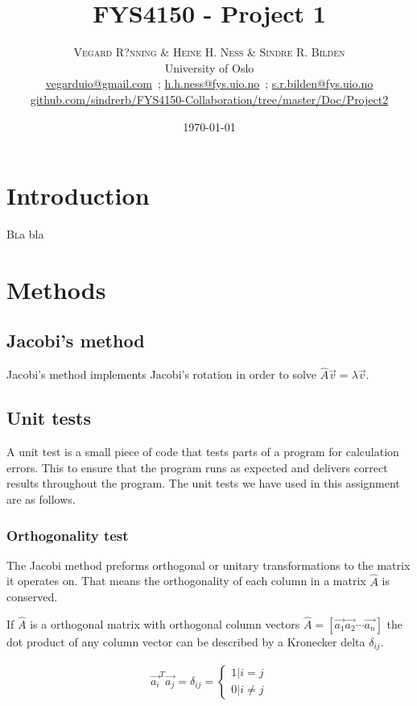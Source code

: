 \documentclass[twoside,twocolumn]{article}
\title{FYS4150 - Project 1} %
\author{%
	\textsc{Vegard R?nning \& Heine H. Ness \& Sindre R. Bilden} \\[1ex] %
	\normalsize University of Oslo \\ %
	\normalsize \href{mailto:vegarduio@gmail.com}{vegarduio@gmail.com}\ ; \href{mailto:h.h.ness@fys.uio.no}{h.h.ness@fys.uio.no}\ ; \href{mailto:s.r.bilden@fys.uio.no}{s.r.bilden@fys.uio.no}\\%
	\footnotesize \href{https://github.com/sindrerb/FYS4150-Collaboration/tree/master/Doc/Project2}{github.com/sindrerb/FYS4150-Collaboration/tree/master/Doc/Project2}
}
\date{\today} %
\newcommand{\nl}{
	
	\medskip
	\noindent
}
\begin{document}
	
	\maketitle
	
	
	\section{Introduction}
	\lettrine[nindent=0em,lines=3]{B}la bla
	
	\section{Methods}
	\subsection{Jacobi's method}
	Jacobi's method implements Jacobi's rotation in order to solve $\hat{A}\vec v=\lambda \vec v$. 
	
	
	\subsection{Unit tests}
	
	A unit test is a small piece of code that tests parts of a program for calculation errors. This to ensure that the program runs as expected and delivers correct results throughout the program. The unit tests we have used in this assignment are as follows.
	
	\subsubsection{Orthogonality test}
	
	The Jacobi method preforms orthogonal or unitary transformations to the matrix it operates on. That means the orthogonality of each column in a matrix $\hat{A}$ is conserved. 
	\nl
	If $\hat{A}$ is a orthogonal matrix with orthogonal column vectors $\hat{A} = [\vec{a_1} \vec{a_2} \cdots \vec{a_n}  ]$ the dot product of any column vector can be described by a Kronecker delta $\delta_{ij}$.
	
	\begin{align*}
	\vec{a_i}^T \vec{a_j} = \delta_{ij} =
	\begin{cases}
	1|i=j\\
	0|i\neq j
	\end{cases}
	\end{align*}
	
\end{document}
